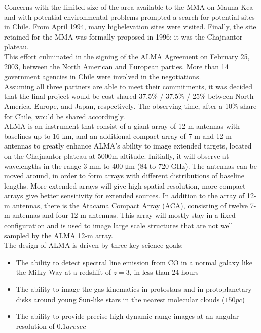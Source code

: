 Concerns with the limited size of the area available to the MMA on Mauna Kea and with potential environmental problems prompted a search for potential sites in Chile. From April 1994, many highelevation sites were visited. Finally, the site retained for the MMA was formally proposed in 1996: it was the Chajnantor plateau. \\

This effort culminated in the signing of the ALMA Agreement on February 25, 2003, between the North American and European parties. More than 14 government agencies in Chile were involved in the negotiations.\\

Assuming all three partners are able to meet their commitments, it was decided that the final project would be cost-shared 37.5\% / 37.5\% / 25\% between North America, Europe, and Japan, respectively. The observing time, after a 10\% share for Chile, would be shared accordingly.\\

ALMA is an instrument that consist of a giant array of 12-m antennas with baselines up to 16 km, and an additional compact array of 7-m and 12-m antennas to greatly enhance ALMA's ability to image extended targets, located on the Chajnantor plateau at 5000m altitude. Initially, it will observe at wavelengths in the range 3 mm to 400 μm (84 to 720 GHz). The antennas can be moved around, in order to form arrays with different distributions of baseline lengths. More extended arrays will give high spatial resolution, more compact arrays give better sensitivity for extended sources. In addition to the array of 12-m antennas, there is the Atacama Compact Array (ACA), consisting of twelve 7-m antennas and four 12-m antennas. This array will mostly stay in a fixed configuration and is used to image large scale structures that are not well sampled by the ALMA 12-m array.\\

The design of ALMA is driven by three key science goals:\\

\begin{itemize}

\item The ability to detect spectral line emission from CO in a normal galaxy like the Milky Way at a redshift of $z=3$, in less than 24 hours

\item The ability to image the gas kinematics in protostars and in protoplanetary disks around young Sun-like stars in the nearest molecular clouds ($150 pc$)

\item The ability to provide precise high dynamic range images at an angular resolution of $0.1 arcsec$
\end{itemize}
 
